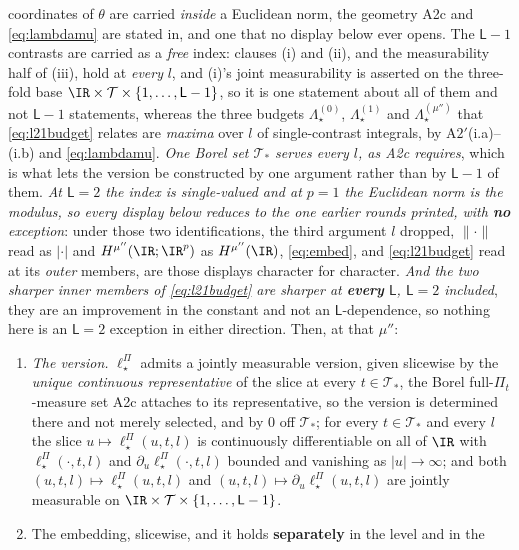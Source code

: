 \begin{lemma}
coordinates of $\theta$ are carried \emph{inside} a Euclidean norm, the geometry A2c and
\eqref{eq:lambdamu} are stated in, and one that no display below ever opens. The $\mathsf L-1$ contrasts are
carried as a \emph{free} index: clauses \textup{(i)} and \textup{(ii)}, and the measurability half of
\textup{(iii)}, hold at \emph{every} $l$, and \textup{(i)}'s joint measurability is asserted on the
three-fold base $\IR\times\mathcal T\times\{1,\dots,\mathsf L-1\}$, so it is one statement about all of
them and not $\mathsf L-1$ statements, whereas the three budgets $\Lambda^{(0)}_\star$,
$\Lambda^{(1)}_\star$ and $\Lambda^{(\mu'')}_\star$ that \eqref{eq:l21budget} relates are \emph{maxima}
over $l$ of single-contrast integrals, by A$2'$(i.a)--(i.b) and \eqref{eq:lambdamu}. \emph{One Borel set
$\mathcal T_\ast$ serves every $l$, as A2c requires}, which is what lets the version be constructed by
one argument rather than by $\mathsf L-1$ of them.
\emph{At $\mathsf L=2$ the index is single-valued and at $p=1$ the Euclidean norm is the
modulus, so every display below reduces to the one earlier rounds printed, with \textbf{no} exception}:
under those two identifications, the third argument $l$ dropped, $\|\cdot\|$ read as $|\cdot|$ and
$H^{\mu''}(\IR;\IR^{p})$ as $H^{\mu''}(\IR)$, \eqref{eq:embed}, and \eqref{eq:l21budget} read at its
\emph{outer} members, are those displays character for character.
\emph{And the two sharper inner members of \eqref{eq:l21budget} are sharper at \textbf{every}
$\mathsf L$, $\mathsf L=2$ included}, they are an improvement in the constant and not an
$\mathsf L$-dependence, so nothing here is an $\mathsf L=2$ exception in either direction.
Then, at that $\mu''$:
\begin{enumerate}
\item[(i)] \emph{The version.} $\ell^\Pi_\star$ admits a jointly measurable version, given slicewise by the
\emph{unique continuous representative} of the slice at every $t\in\mathcal T_\ast$, the Borel
full-$\Pi_t$-measure set A2c attaches to its representative, so the version is determined there and not
merely selected, and by $0$ off $\mathcal T_\ast$; for every $t\in\mathcal T_\ast$ and every $l$ the
slice $u\mapsto\ell^\Pi_\star(u,t,l)$ is continuously differentiable on all of $\IR$ with
$\ell^\Pi_\star(\cdot,t,l)$ and $\partial_u\ell^\Pi_\star(\cdot,t,l)$ bounded and vanishing as
$|u|\to\infty$; and both $(u,t,l)\mapsto\ell^\Pi_\star(u,t,l)$ and
$(u,t,l)\mapsto\partial_u\ell^\Pi_\star(u,t,l)$ are jointly measurable on
$\IR\times\mathcal T\times\{1,\dots,\mathsf L-1\}$.
\item[(ii)] The embedding, slicewise, and it holds \textbf{separately} in the level and in the

\end{enumerate}
\end{lemma}
